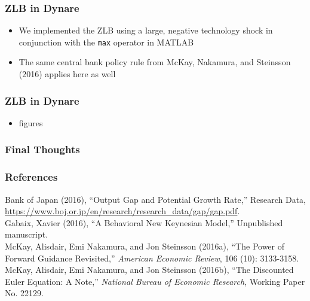 \documentclass{beamer}
\begin{document}

\begin{frame}
	\frametitle{ZLB in Dynare}
	\begin{itemize}
		\item We implemented the ZLB using a large, negative technology shock in conjunction with the \texttt{max} operator in MATLAB
		\vspace{8pt}
		\item The same central bank policy rule from McKay, Nakamura, and Steinsson (2016) applies here as well
	\end{itemize}
\end{frame}


\begin{frame}
	\frametitle{ZLB in Dynare}
	\begin{itemize}
		\item figures
	\end{itemize}
\end{frame}


\begin{frame}
	\frametitle{Final Thoughts}
\end{frame}


\begin{frame}
	\frametitle{References}
	\begin{flushleft}
		\footnotesize
		Bank of Japan (2016), ``Output Gap and Potential Growth Rate,'' Research Data, \url{https://www.boj.or.jp/en/research/research\_data/gap/gap.pdf}.\\
		\vspace{7pt}
		Gabaix, Xavier (2016), ``A Behavioral New Keynesian Model,'' Unpublished manuscript.\\
		\vspace{7pt}
		McKay, Alisdair, Emi Nakamura, and Jon Steinsson (2016a), ``The Power of Forward Guidance Revisited,'' \textit{American Economic Review}, 106 (10): 3133-3158.\\
		\vspace{7pt}
		McKay, Alisdair, Emi Nakamura, and Jon Steinsson (2016b), ``The Discounted Euler Equation: A Note,'' \textit{National Bureau of Economic Research}, Working Paper No. 22129.
	\end{flushleft}
\end{frame}

\end{document}
